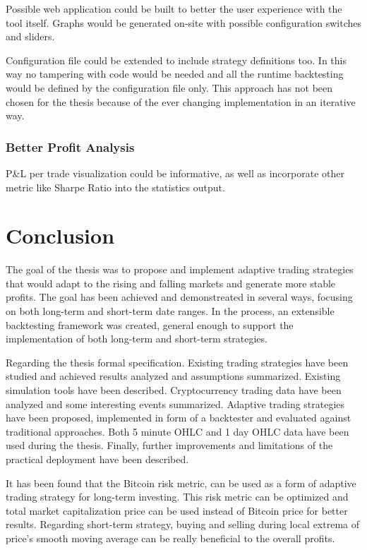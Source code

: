 Possible web application could be built to better the user experience with the tool itself. Graphs would be generated on-site with possible configuration switches and sliders.

Configuration file could be extended to include strategy definitions too. In this way no tampering with code would be needed and all the runtime backtesting would be defined by the configuration file only. This approach has not been chosen for the thesis because of the ever changing implementation in an iterative way.

\subsection*{Better Profit Analysis}
P\&L per trade visualization could be informative, as well as incorporate other metric like Sharpe Ratio into the statistics output.

\chapter{Conclusion}
\label{conclusion}
The goal of the thesis was to propose and implement adaptive trading strategies that would adapt to the rising and falling markets and generate more stable profits. The goal has been achieved and demonstreated in several ways, focusing on both long-term and short-term date ranges. In the process, an extensible backtesting framework was created, general enough to support the implementation of both long-term and short-term strategies.

Regarding the thesis formal specification. Existing trading strategies have been studied and achieved results analyzed and assumptions summarized. Existing simulation tools have been described. Cryptocurrency trading data have been analyzed and some interesting events summarized. Adaptive trading strategies have been proposed, implemented in form of a backtester and evaluated against traditional approaches. Both 5 minute OHLC and 1 day OHLC data have been used during the thesis. Finally, further improvements and limitations of the practical deployment have been described.

It has been found that the Bitcoin risk metric, can be used as a form of adaptive trading strategy for long-term investing. This risk metric can be optimized and total market capitalization price can be used instead of Bitcoin price for better results. Regarding short-term strategy, buying and selling during local extrema of price's smooth moving average can be really beneficial to the overall profits.

